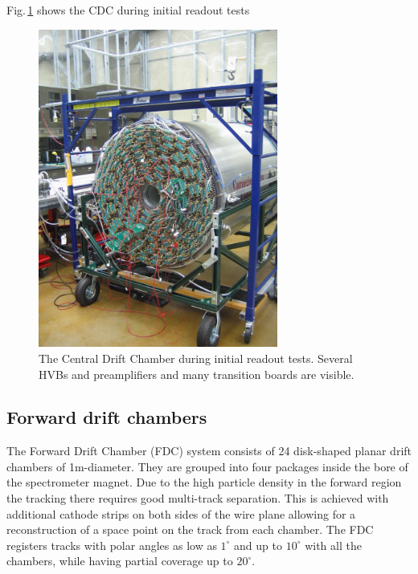 Fig.\,\ref{fig:CDC_rhs}  shows the CDC during initial readout tests 
\begin{figure}[tbp]
\begin{center}
\includegraphics[width=0.7\textwidth]{figures/cdc_rhs.jpg}  
\caption{\label{fig:CDC_rhs}          
  The Central Drift Chamber during initial readout tests. Several HVBs and preamplifiers and many transition boards are visible.}
  \end{center}
\end{figure}


\subsection[Forward drift chambers (Lubomir)]{Forward drift chambers
\label{sec:fdc} }

The Forward Drift Chamber (FDC) system consists of 24 disk-shaped planar drift chambers of 1m-diameter.
They are grouped into four packages inside the bore of the spectrometer magnet.
Due to the high particle density in the forward region the tracking there requires
good multi-track separation.
This is achieved with additional cathode strips on both sides of the wire plane allowing for a  reconstruction of a space point on the track from each chamber. 
The FDC registers tracks with polar angles as low as $1^\circ$ and up to $10^\circ $
with all the chambers, while having partial coverage up to $20^\circ$.


